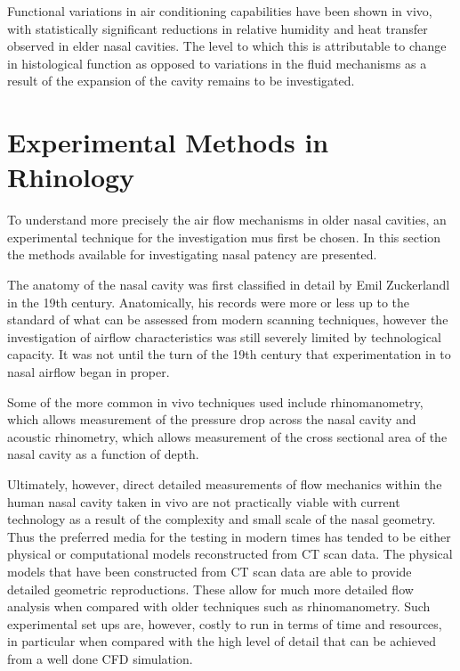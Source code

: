 Functional variations in air conditioning capabilities have been shown in vivo\cite{Lindemann2008}, with statistically significant reductions in relative humidity and heat transfer observed in elder nasal cavities. The level to which this is attributable to change in histological function as opposed to variations in the fluid mechanisms as a result of the expansion of the cavity remains to be investigated.

 \section{Experimental Methods in Rhinology}
 
To understand more precisely the air flow mechanisms in older nasal cavities, an experimental technique for the investigation mus first be chosen. In this section the methods available for investigating nasal patency are presented.

The anatomy of the nasal cavity was first classified in detail by Emil Zuckerlandl in the 19th century\cite{Stammberger1989}. Anatomically, his records were more or less up to the standard of what can be assessed from modern scanning techniques\cite{Stammberger1989}, however the investigation of airflow characteristics was still severely limited by technological capacity\cite{Eccles2000}. It was not until the turn of the 19th century that experimentation in to nasal airflow began in proper\cite{Eccles2000}. 

Some of the more common in vivo techniques used include rhinomanometry, which allows measurement of the pressure drop across the nasal cavity\cite{Hilberg1989} and acoustic rhinometry, which allows measurement of the cross sectional area of the nasal cavity as a function of depth\cite{Hilberg1989}. 

Ultimately, however, direct detailed measurements of flow mechanics within the human nasal cavity taken in vivo are not practically viable with current technology as a result of the complexity and small scale of the nasal geometry\cite{Doorly2008c}. Thus the preferred media for the testing in modern times has tended to be either physical or computational models reconstructed from CT scan data\cite{Doorly2008c}. The physical models that have been constructed from CT scan data are able to provide detailed geometric reproductions. These allow for much more detailed flow analysis when compared with older techniques such as rhinomanometry\cite{Ma2009}. Such experimental set ups are, however, costly to run in terms of time and resources, in particular when compared with the high level of detail that can be achieved from a well done CFD simulation\cite{Ma2009}.


